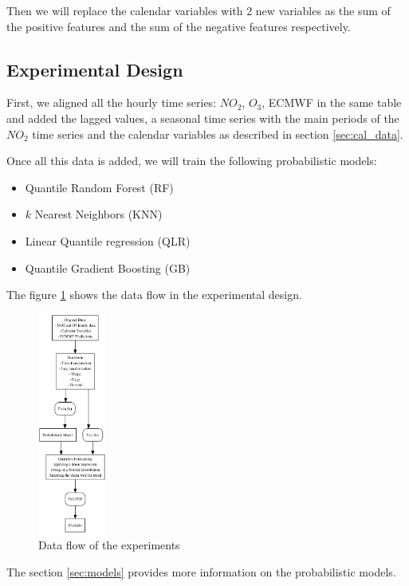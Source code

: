 \documentclass[a4paper,twocolumn,5p]{elsarticle}
\begin{document}
Then we will replace the calendar variables with 2 new variables as the sum of the positive 
features and the sum of the negative features respectively.

\subsection{Experimental Design}
\label{sec:experimental-design}

First, we aligned all the hourly time series: $NO_2$, $O_3$, ECMWF in the same table 
and added the lagged values, a seasonal time series with the main periods of the $NO_2$ time series
and the calendar variables as described in section \ref{sec:cal_data}.

Once all this data is added, we will train the following probabilistic 
models:
\begin{itemize}
  \item Quantile Random Forest (RF)
  \item $k$ Nearest Neighbors (KNN)
  \item Linear Quantile regression (QLR)
  \item Quantile Gradient Boosting (GB)
\end{itemize}

The figure \ref{figure:dataflow} shows the data flow in the experimental design.  

\begin{figure}
  \centering
  \includegraphics[width=0.2\textwidth]{diagrams/flow}
  \caption{Data flow of the experiments}
  \label{figure:dataflow}
\end{figure}

The section \ref{sec:models} provides more information on the probabilistic models.
\end{document}
